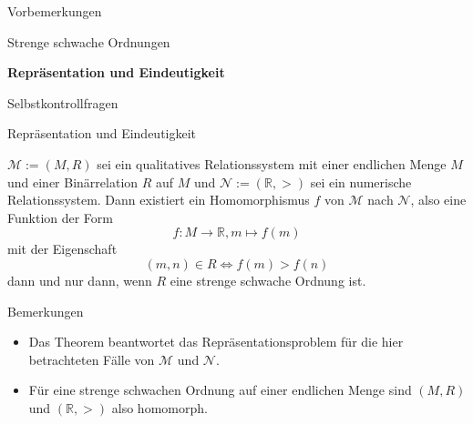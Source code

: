 \documentclass[
  8pt,
  ignorenonframetext,
]{beamer}
\providecommand{\tightlist}{%
  \setlength{\itemsep}{0pt}\setlength{\parskip}{0pt}}
\begin{document}
\begin{frame}{}
\protect\hypertarget{section-4}{}
\Large
{}
\vfill

Vorbemerkungen

Strenge schwache Ordnungen

\textbf{Repräsentation und Eindeutigkeit}

Selbstkontrollfragen \vfill
\end{frame}

\begin{frame}{Repräsentation und Eindeutigkeit}
\protect\hypertarget{repruxe4sentation-und-eindeutigkeit}{}
\small
\begin{theorem}
\justifying
\normalfont
$\mathcal{M} := (M,R)$ sei ein qualitatives Relationssystem mit einer endlichen Menge
$M$ und einer Binärrelation $R$ auf $M$ und $\mathcal{N} := (\mathbb{R},>)$ sei
ein numerische Relationssystem. Dann existiert ein Homomorphismus $f$ von
$\mathcal{M}$ nach $\mathcal{N}$, also eine Funktion der Form
\begin{equation}
f : M \to \mathbb{R}, m \mapsto f(m)
\end{equation}
mit der Eigenschaft
\begin{equation}
(m,n) \in R \Leftrightarrow f(m) > f(n)
\end{equation}
dann und nur dann, wenn $R$ eine strenge schwache Ordnung ist.
\end{theorem}

\footnotesize

Bemerkungen

\begin{itemize}
\tightlist
\item
  Das Theorem beantwortet das Repräsentationsproblem für die hier
  betrachteten Fälle von \(\mathcal{M}\) und \(\mathcal{N}\).
\item
  Für eine strenge schwachen Ordnung auf einer endlichen Menge sind
  \((M,R)\) und \((\mathbb{R},>)\) also homomorph.
\end{itemize}
\end{frame}
\end{document}
